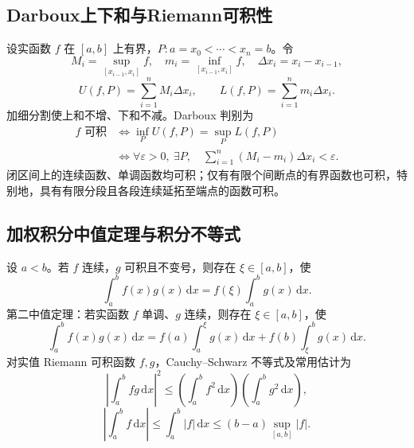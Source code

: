 \documentclass[../main.tex]{subfiles}
\begin{document}
\subsection{Darboux上下和与Riemann可积性}
设实函数 $f$ 在 $[a,b]$ 上有界，$P:a=x_0<\cdots<x_n=b$。令
\[
M_i=\sup_{[x_{i-1},x_i]}f,\quad
m_i=\inf_{[x_{i-1},x_i]}f,\quad\Delta x_i=x_i-x_{i-1},
\]
\[
U(f,P)=\sum_{i=1}^nM_i\Delta x_i,\qquad
L(f,P)=\sum_{i=1}^nm_i\Delta x_i.
\]
加细分割使上和不增、下和不减。Darboux 判别为
\[
\begin{aligned}
f\text{ 可积}
&\iff\inf_PU(f,P)=\sup_PL(f,P)\\
&\iff\forall\varepsilon>0,\ \exists P,\quad
\sum_{i=1}^n(M_i-m_i)\Delta x_i<\varepsilon.
\end{aligned}
\]
闭区间上的连续函数、单调函数均可积；仅有有限个间断点的有界函数也可积，特别地，具有有限分段且各段连续延拓至端点的函数可积。
\subsection{加权积分中值定理与积分不等式}
设 $a<b$。若 $f$ 连续，$g$ 可积且不变号，则存在 $\xi\in[a,b]$，使
\[
\int_a^bf(x)g(x)\,\mathrm dx=f(\xi)\int_a^bg(x)\,\mathrm dx.
\]
第二中值定理：若实函数 $f$ 单调、$g$ 连续，则存在 $\xi\in[a,b]$，使
\[
\int_a^bf(x)g(x)\,\mathrm dx
=f(a)\int_a^\xi g(x)\,\mathrm dx
+f(b)\int_\xi^bg(x)\,\mathrm dx.
\]
对实值 Riemann 可积函数 $f,g$，Cauchy--Schwarz 不等式及常用估计为
\[
\left|\int_a^bfg\,\mathrm dx\right|^2
\le\left(\int_a^bf^2\,\mathrm dx\right)
\left(\int_a^bg^2\,\mathrm dx\right),
\]
\[
\left|\int_a^bf\,\mathrm dx\right|
\le\int_a^b|f|\,\mathrm dx
\le(b-a)\sup_{[a,b]}|f|.
\]
\end{document}
